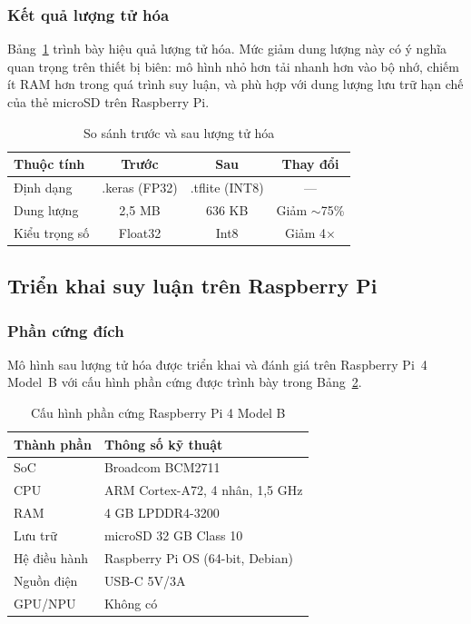 \documentclass[conference]{IEEEtran}
\begin{document}
\subsubsection{Kết quả lượng tử hóa}

Bảng~\ref{tab:quantization} trình bày hiệu quả lượng tử hóa. Mức giảm dung lượng này có ý nghĩa quan trọng trên thiết bị biên: mô hình nhỏ hơn tải nhanh hơn vào bộ nhớ, chiếm ít RAM hơn trong quá trình suy luận, và phù hợp với dung lượng lưu trữ hạn chế của thẻ microSD trên Raspberry Pi.

\begin{table}[htbp]
\centering
\caption{So sánh trước và sau lượng tử hóa}
\label{tab:quantization}
\begin{tabular}{lccc}
\toprule
\textbf{Thuộc tính} & \textbf{Trước} & \textbf{Sau} & \textbf{Thay đổi} \\
\midrule
Định dạng       & .keras (FP32) & .tflite (INT8) & --- \\
Dung lượng      & 2,5 MB       & 636 KB & Giảm $\sim$75\% \\
Kiểu trọng số   & Float32      & Int8 & Giảm 4$\times$ \\
\bottomrule
\end{tabular}
\end{table}

\subsection{Triển khai suy luận trên Raspberry Pi}

\subsubsection{Phần cứng đích}

Mô hình sau lượng tử hóa được triển khai và đánh giá trên Raspberry Pi~4 Model~B với cấu hình phần cứng được trình bày trong Bảng~\ref{tab:hardware}.

\begin{table}[htbp]
\centering
\caption{Cấu hình phần cứng Raspberry Pi 4 Model B}
\label{tab:hardware}
\begin{tabular}{ll}
\toprule
\textbf{Thành phần} & \textbf{Thông số kỹ thuật} \\
\midrule
SoC       & Broadcom BCM2711 \\
CPU       & ARM Cortex-A72, 4 nhân, 1,5 GHz \\
RAM       & 4 GB LPDDR4-3200 \\
Lưu trữ  & microSD 32 GB Class 10 \\
Hệ điều hành & Raspberry Pi OS (64-bit, Debian) \\
Nguồn điện   & USB-C 5V/3A \\
GPU/NPU   & Không có \\
\bottomrule
\end{tabular}
\end{table}
\end{document}
